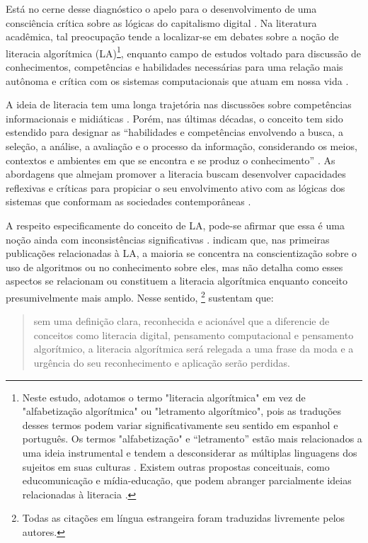 Está no cerne desse diagnóstico o apelo para o desenvolvimento de uma
consciência crítica sobre as lógicas do capitalismo digital \cite{Buckingham2022}. Na literatura acadêmica, tal preocupação tende a localizar-se em
debates sobre a noção de literacia algorítmica (LA)\footnote{Neste
  estudo, adotamos o termo "literacia algorítmica" em vez de
  "alfabetização algorítmica" ou "letramento algorítmico", pois as
  traduções desses termos podem variar significativamente seu sentido em
  espanhol e português. Os termos "alfabetização" e ``letramento'' estão
  mais relacionados a uma ideia instrumental e tendem a desconsiderar as
  múltiplas linguagens dos sujeitos em suas culturas \cite{Mora2016}.
  Existem outras propostas conceituais, como educomunicação e
  mídia-educação, que podem abranger parcialmente ideias relacionadas à
  literacia \cite{Rosa2016}.}, enquanto campo de estudos voltado para
discussão de conhecimentos, competências e habilidades necessárias para
uma relação mais autônoma e crítica com os sistemas computacionais que
atuam em nossa vida \cite{DogrueL2021}.

A ideia de literacia tem uma longa trajetória nas discussões sobre
competências informacionais e midiáticas \cite{Mora2016}. Porém, nas
últimas décadas, o conceito tem sido estendido para designar as
``habilidades e competências envolvendo a busca, a seleção, a análise, a
avaliação e o processo da informação, considerando os meios, contextos e
ambientes em que se encontra e se produz o conhecimento'' \cite{Rosa2016}. As abordagens que almejam promover a literacia buscam
desenvolver capacidades reflexivas e críticas para propiciar o seu
envolvimento ativo com as lógicas dos sistemas que conformam as
sociedades contemporâneas \cite{Pangrazio2022}.

A respeito especificamente do conceito de LA, pode-se afirmar que essa é
uma noção ainda com inconsistências significativas \cite{Hargittai2020}. \cite{DogrueL2022} indicam que, nas primeiras
publicações relacionadas à LA, a maioria se concentra na conscientização
sobre o uso de algoritmos ou no conhecimento sobre eles, mas não detalha
como esses aspectos se relacionam ou constituem a literacia algorítmica
enquanto conceito presumivelmente mais amplo. Nesse sentido, \textcite[p.~2]{Ridley2021}
\footnote{Todas as citações em língua
  estrangeira foram traduzidas livremente pelos autores.} sustentam que:

\begin{quote}
sem uma definição clara, reconhecida e acionável que a diferencie de
conceitos como literacia digital, pensamento computacional e pensamento
algorítmico, a literacia algorítmica será relegada a uma frase da moda e
a urgência do seu reconhecimento e aplicação serão perdidas.
\end{quote}

